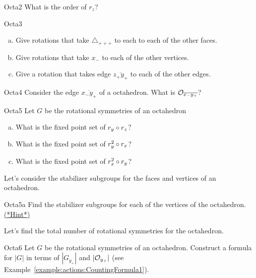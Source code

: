 \begin{exercise}{Octa2}
What is the order of $r_z$?
\end{exercise}

\begin{exercise}{Octa3}
\begin{enumerate}[(a)]
\item Give rotations that take $\triangle _{+++}$ to each to each of the other faces.
\item Give rotations that take  $x_-$ to each of the other vertices.
\item Give a rotation that takes edge $\overline{z_+y_+}$ to each of the other edges.
\end{enumerate}
\end{exercise} 
\begin{exercise}{Octa4}
Consider the edge $\overline{x_-y_+}$ of a octahedron. What is ${\cal O}_{\overline{x_-y_+}}$?
\end {exercise}

\begin{exercise}{Octa5}
Let $G$ be the rotational symmetries of an octahedron
\begin{enumerate}[(a)]
\item  What is the fixed point set of $r_{y}\circ r_{z}$?
\item What is the fixed point set of $r_{y}^2\circ r_{x}$? 
\item What is the fixed point set of $r_{x}^2\circ r_{y}$?
\end{enumerate}
\end {exercise}

Let's consider the stabilizer subgroups for the faces and vertices of an octahedron.  
 
\begin{exercise}{Octa5a}
Find the stabilizer subgroups for each of the vertices of the octahedron. 
\hyperref[sec:actions:hints]{(*Hint*)}
\end{exercise}

Let's find the total number of rotational symmetries for the octahedron. 

\begin{exercise}{Octa6} 
Let $G$ be the rotational symmetries of an octahedron. Construct a formula for $|G|$ in terms of $| G_{y_+}|$ and $|{\cal O}_{y_+}|$ (see Example~\ref{example:actions:CountingFormula1}).
 \end {exercise}

